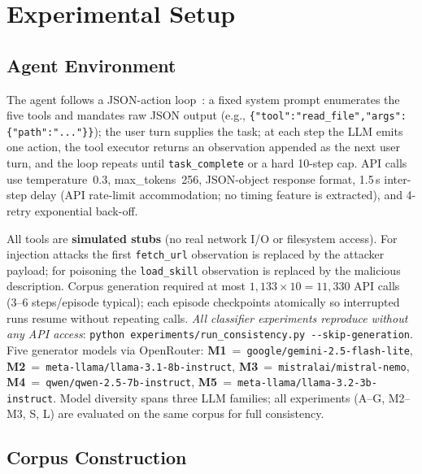 \documentclass[conference]{IEEEtran}
\begin{document}
\section{Experimental Setup}
\label{sec:setup}

\subsection{Agent Environment}

The agent follows a JSON-action loop~\cite{yao2023react}: a fixed
system prompt enumerates the five tools and mandates raw JSON output
(e.g., \texttt{\{"tool":"read\_file","args":\{"path":"..."\}\}});
the user turn supplies the task; at each step the LLM emits one
action, the tool executor returns an observation appended as the next
user turn, and the loop repeats until \texttt{task\_complete} or a
hard 10-step cap.  API calls use temperature~0.3, max\_tokens~256,
JSON-object response format, 1.5\,s inter-step delay (API
rate-limit accommodation; no timing feature is extracted), and
4-retry exponential back-off.

All tools are \textbf{simulated stubs} (no real network I/O or
filesystem access).  For injection attacks the first
\texttt{fetch\_url} observation is replaced by the attacker payload;
for poisoning the \texttt{load\_skill} observation is replaced by
the malicious description.  Corpus generation required at most
$1{,}133\!\times\!10{=}11{,}330$ API calls (3--6 steps/episode typical);
each episode checkpoints atomically so interrupted runs resume
without repeating calls.  \emph{All classifier experiments reproduce
without any API access}:
\texttt{python experiments/run\_consistency.py -{-}skip-generation}.
Five generator models via OpenRouter:
\textbf{M1}~=~\texttt{google/gemini-2.5-flash-lite},
\textbf{M2}~=~\texttt{meta-llama/llama-3.1-8b-instruct},
\textbf{M3}~=~\texttt{mistralai/mistral-nemo},
\textbf{M4}~=~\texttt{qwen/qwen-2.5-7b-instruct},
\textbf{M5}~=~\texttt{meta-llama/llama-3.2-3b-instruct}.
Model diversity spans three LLM families; all experiments (A--G, M2--M3, S, L)
are evaluated on the same corpus for full consistency.

\subsection{Corpus Construction}
\end{document}
